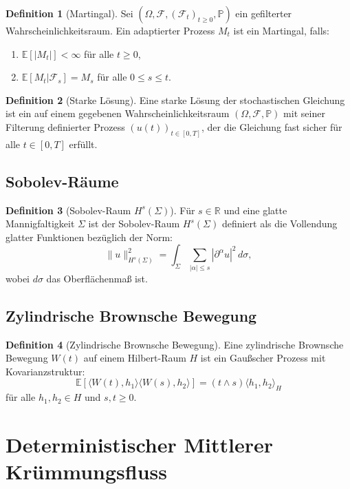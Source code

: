 \documentclass[a4paper,12pt]{article}
\theoremstyle{definition}
\newtheorem{definition}{Definition}
\begin{document}
\begin{definition}[Martingal]
	Sei $(\Omega, \mathcal{F}, (\mathcal{F}_t)_{t \geq 0}, \mathbb{P})$ ein gefilterter Wahrscheinlichkeitsraum. Ein adaptierter Prozess $M_t$ ist ein Martingal, falls:
	\begin{enumerate}
		\item $\mathbb{E}[|M_t|] < \infty$ für alle $t \geq 0$,
		\item $\mathbb{E}[M_t | \mathcal{F}_s] = M_s$ für alle $0 \leq s \leq t$.
	\end{enumerate}
\end{definition}

\begin{definition}[Starke Lösung]
	Eine starke Lösung der stochastischen Gleichung ist ein auf einem gegebenen Wahrscheinlichkeitsraum $(\Omega, \mathcal{F}, \mathbb{P})$ mit seiner Filterung definierter Prozess $(u(t))_{t \in [0,T]}$, der die Gleichung fast sicher für alle $t \in [0,T]$ erfüllt.
\end{definition}

\subsection{Sobolev-Räume}

\begin{definition}[Sobolev-Raum $H^s(\Sigma)$]
	Für $s \in \mathbb{R}$ und eine glatte Mannigfaltigkeit $\Sigma$ ist der Sobolev-Raum $H^s(\Sigma)$ definiert als die Vollendung glatter Funktionen bezüglich der Norm:
	\[
	\|u\|_{H^s(\Sigma)}^2 = \int_\Sigma \sum_{|\alpha| \leq s} |\partial^\alpha u|^2 \, d\sigma,
	\]
	wobei $d\sigma$ das Oberflächenmaß ist.
\end{definition}

\subsection{Zylindrische Brownsche Bewegung}

\begin{definition}[Zylindrische Brownsche Bewegung]
	Eine zylindrische Brownsche Bewegung $W(t)$ auf einem Hilbert-Raum $H$ ist ein Gaußscher Prozess mit Kovarianzstruktur:
	\[
	\mathbb{E}[\langle W(t), h_1 \rangle \langle W(s), h_2 \rangle] = (t \wedge s) \langle h_1, h_2 \rangle_H
	\]
	für alle $h_1, h_2 \in H$ und $s,t \geq 0$.
\end{definition}

\section{Deterministischer Mittlerer Krümmungsfluss}
\label{sec:deterministic}
\end{document}
